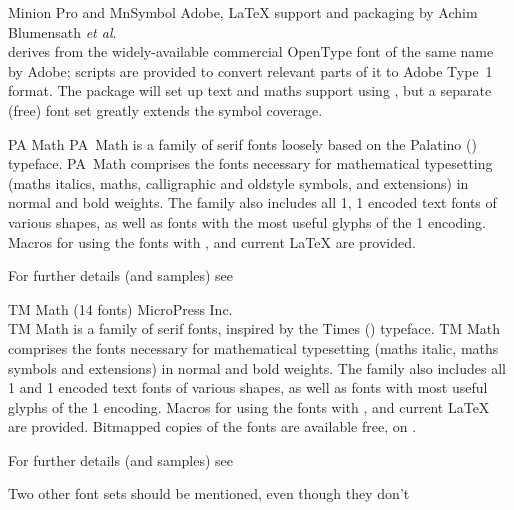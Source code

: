 \begin{booklist}
\item[Minion Pro and MnSymbol]Adobe, \LaTeX{} support and packaging by
  Achim Blumensath \emph{et al}.\\
   derives from the widely-available commercial
  OpenType font of the same name by Adobe; scripts are provided to
  convert relevant parts of it to Adobe Type~1 format.  The
   package will set up text and maths support using
  , but a separate (free) font set
   greatly extends the symbol coverage.

\item[PA Math] PA~Math is a family of serif fonts
  loosely based on the Palatino () typeface.  PA~Math
  comprises the fonts necessary for mathematical typesetting (maths
  italics, maths, calligraphic and oldstyle symbols, and extensions)
  in normal and bold weights. The family also includes all 1,
  1 encoded text fonts of various shapes, as well as fonts
  with the most useful glyphs of the 1 encoding.  Macros for
  using the fonts with \plaintex{}, \LaTeXo{} and current \LaTeX{}
  are provided.

  \nothtml{\bgroup\raggedwithindent}
  For further details (and samples) see\\
  \nothtml{\par\egroup}

\item[TM Math](14 fonts) MicroPress Inc.\\
  TM Math is a family of serif fonts, inspired by the Times
  () typeface.  TM Math comprises the fonts necessary for
  mathematical typesetting (maths italic, maths symbols and extensions)
  in normal and bold weights. The family also includes all 1
  and 1 encoded text fonts of various shapes, as well as fonts
  with most useful glyphs of the 1 encoding.  Macros for
  using the fonts with \plaintex{}, \LaTeXo{} and current \LaTeX{}
  are provided.  Bitmapped copies of the fonts are available free, on
  .

  \nothtml{\bgroup\raggedwithindent}
  For further details (and samples) see\\
  \nothtml{\par\egroup}
\end{booklist}
Two other font sets should be mentioned, even though they don't
